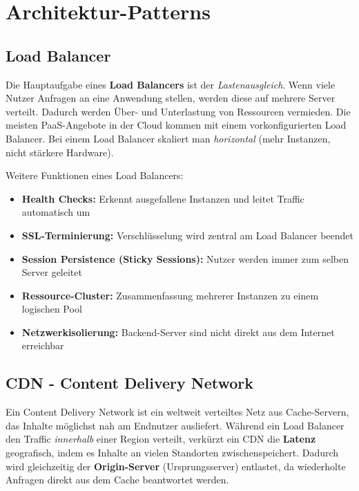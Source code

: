 \section{Architektur-Patterns}

\subsection{Load Balancer}
Die Hauptaufgabe eines \textbf{Load Balancers} ist der \emph{Lastenausgleich}. Wenn viele Nutzer Anfragen an eine Anwendung stellen, werden diese auf mehrere Server verteilt. Dadurch werden Über- und Unterlastung von Ressourcen vermieden. Die meisten PaaS-Angebote in der Cloud kommen mit einem vorkonfigurierten Load Balancer. Bei einem Load Balancer skaliert man \emph{horizontal} (mehr Instanzen, nicht stärkere Hardware).

Weitere Funktionen eines Load Balancers:
\begin{itemize}
    \item \textbf{Health Checks:} Erkennt ausgefallene Instanzen und leitet Traffic automatisch um
    \item \textbf{SSL-Terminierung:} Verschlüsselung wird zentral am Load Balancer beendet
    \item \textbf{Session Persistence (Sticky Sessions):} Nutzer werden immer zum selben Server geleitet
    \item \textbf{Ressource-Cluster:} Zusammenfassung mehrerer Instanzen zu einem logischen Pool
    \item \textbf{Netzwerkisolierung:} Backend-Server sind nicht direkt aus dem Internet erreichbar
\end{itemize}

\subsection{CDN - Content Delivery Network}
Ein Content Delivery Network ist ein weltweit verteiltes Netz aus Cache-Servern,
das Inhalte möglichst nah am Endnutzer ausliefert. Während ein Load Balancer den
Traffic \emph{innerhalb} einer Region verteilt, verkürzt ein CDN die \textbf{Latenz}
geografisch, indem es Inhalte an vielen Standorten zwischenspeichert. Dadurch wird
gleichzeitig der \textbf{Origin-Server} (Ursprungsserver) entlastet, da wiederholte
Anfragen direkt aus dem Cache beantwortet werden.

